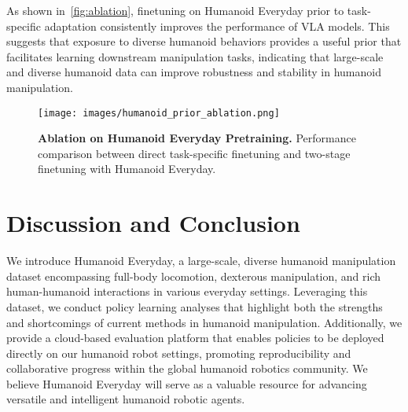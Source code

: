 \documentclass[letterpaper, 10pt, conference]{ieeeconf}
\begin{document}
As shown in~\autoref{fig:ablation}, finetuning on Humanoid Everyday prior to task-specific adaptation consistently improves the performance of VLA models. This suggests that exposure to diverse humanoid behaviors provides a useful prior that facilitates learning downstream manipulation tasks, indicating that large-scale and diverse humanoid data can improve robustness and stability in humanoid manipulation.

\begin{figure}[H]
  \centering
  \texttt{[image: images/humanoid\_prior\_ablation.png]}
  \caption{\textbf{Ablation on Humanoid Everyday Pretraining.} Performance comparison between direct task-specific finetuning and two-stage finetuning with Humanoid Everyday.}
  \label{fig:ablation}
\end{figure}


\section{Discussion and Conclusion}
We introduce Humanoid Everyday, a large-scale, diverse humanoid manipulation dataset encompassing full-body locomotion, dexterous manipulation, and rich human-humanoid interactions in various everyday settings. Leveraging this dataset, we conduct policy learning analyses that highlight both the strengths and shortcomings of current methods in humanoid manipulation. Additionally, we provide a cloud-based evaluation platform that enables policies to be deployed directly on our humanoid robot settings, promoting reproducibility and collaborative progress within the global humanoid robotics community. We believe Humanoid Everyday will serve as a valuable resource for advancing versatile and intelligent humanoid robotic agents.
\end{document}
